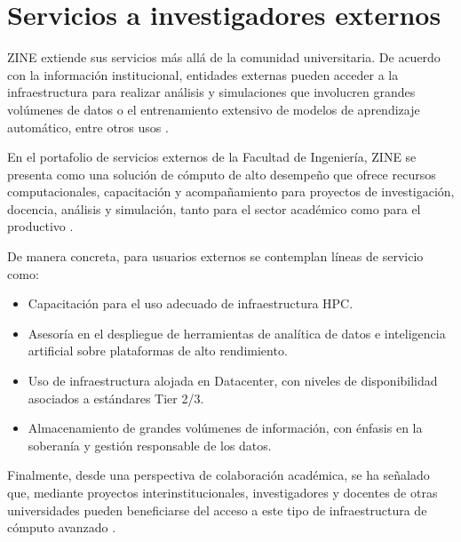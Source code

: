 \section{Servicios a investigadores externos}
ZINE extiende sus servicios más allá de la comunidad universitaria. De acuerdo con la información institucional, entidades externas pueden acceder a la infraestructura para realizar análisis y simulaciones que involucren grandes volúmenes de datos o el entrenamiento extensivo de modelos de aprendizaje automático, entre otros usos \cite{zine_oficial}.

En el portafolio de servicios externos de la Facultad de Ingeniería, ZINE se presenta como una solución de cómputo de alto desempeño que ofrece recursos computacionales, capacitación y acompañamiento para proyectos de investigación, docencia, análisis y simulación, tanto para el sector académico como para el productivo \cite{servicios_externos_zine}.

De manera concreta, para usuarios externos se contemplan líneas de servicio como:
\begin{itemize}
  \item Capacitación para el uso adecuado de infraestructura HPC.
  \item Asesoría en el despliegue de herramientas de analítica de datos e inteligencia artificial sobre plataformas de alto rendimiento.
  \item Uso de infraestructura alojada en Datacenter, con niveles de disponibilidad asociados a estándares Tier 2/3.
  \item Almacenamiento de grandes volúmenes de información, con énfasis en la soberanía y gestión responsable de los datos.
\end{itemize}
\cite{servicios_externos_zine}

Finalmente, desde una perspectiva de colaboración académica, se ha señalado que, mediante proyectos interinstitucionales, investigadores y docentes de otras universidades pueden beneficiarse del acceso a este tipo de infraestructura de cómputo avanzado \cite{pesquisa_zine_2012}.
